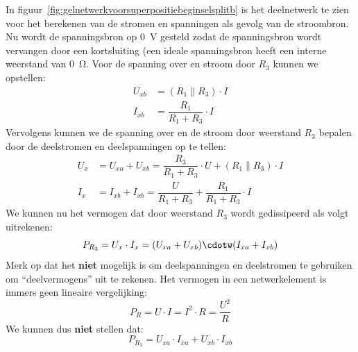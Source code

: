 In figuur~\ref{fig:gelnetwerkvoorsuperpositiebeginselsplitb} is het deelnetwerk
te zien voor het berekenen van de stromen en spanningen als gevolg van de stroombron.
Nu wordt de spanningsbron op \SI{0}{\volt} gesteld zodat de spanningsbron wordt vervangen
door een kortsluiting (een ideale spanningsbron heeft een interne weerstand van \SI{0}{\ohm}.
Voor de spanning over en stroom door $R_3$ kunnen we opstellen:
%
\begin{equation}
\begin{split}
U_{xb} &= (R_1\parallel R_3)\cdot I \\
I_{xb} &= \dfrac{R_1}{R_1+R_3}\cdot I
\end{split}
\end{equation}
%
Vervolgens kunnen we de spanning over en de stroom door weerstand $R_3$ bepalen door
de deelstromen en deelspanningen op te tellen:
%
\begin{equation}
\begin{split}
U_x &= U_{xa} + U_{xb} = \dfrac{R_3}{R_1+R_3}\cdot U + (R_1\parallel R_3)\cdot I \\
I_x &= I_{xb} + I_{xb} = \dfrac{U}{R_1+R_3} + \dfrac{R_1}{R_1+R_3}\cdot I
\end{split}
\end{equation}
%
We kunnen nu het vermogen dat door weerstand $R_3$ wordt gedissipeerd als volgt
uitrekenen:
%
\begin{equation}
P_{R_3} = U_x\cdot I_x = (U_{xa} + U_{xb})\cdotw (I_{xa} + I_{xb})
\end{equation}
%
Merk op dat het \textbf{niet} mogelijk is om deelspanningen en deelstromen
te gebruiken om ``deelvermogens'' uit te rekenen. Het vermogen in een netwerkelement
is immers geen lineaire vergelijking:
%
\begin{equation}
P_R = U\cdot I = I^2\cdot R = \dfrac{U^2}{R}
\end{equation}
%
We kunnen dus \textbf{niet} stellen dat:
\begin{equation}
P_{R_3} = U_{xa}\cdot I_{xa} + U_{xb}\cdot I_{xb}
\end{equation}

